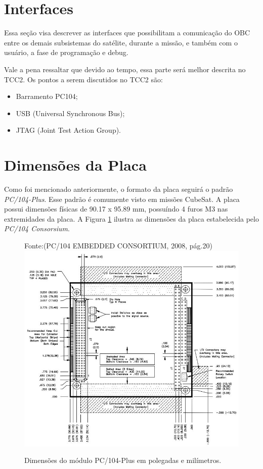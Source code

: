 \section{Interfaces}

Essa seção visa descrever as interfaces que possibilitam a comunicação do OBC entre os demais subsistemas do satélite, durante a missão, e também com o usuário, a fase de programação e debug.

Vale a pena ressaltar que devido ao tempo, essa parte será melhor descrita no TCC2. Os pontos a serem discutidos no TCC2 são:

\begin{itemize}
\item Barramento PC104;
\item USB (Universal Synchronous Bus);
\item JTAG (Joint Test Action Group).
\end{itemize}

\section{Dimensões da Placa}

Como foi mencionado anteriormente, o formato da placa seguirá o padrão \textit{PC/104-Plus}. Esse padrão é comumente visto em missões CubeSat. A placa possui dimensões físicas de 90.17 x 95.89 mm, possuíndo 4 furos M3 nas extremidades da placa. A Figura \ref{pc104} ilustra as dimensões da placa estabelecida pelo \textit{PC/104 Consorsium}.

\begin{figure}[h]
	\centering
    Fonte:(PC/104 EMBEDDED CONSORTIUM, 2008, pág.20)
	\includegraphics[keepaspectratio=true,scale=0.7]{figuras/pc104_32bit.PNG}
	\caption{Dimensões do módulo PC/104-Plus em polegadas e milímetros.}
	\label{pc104}
\end{figure}

